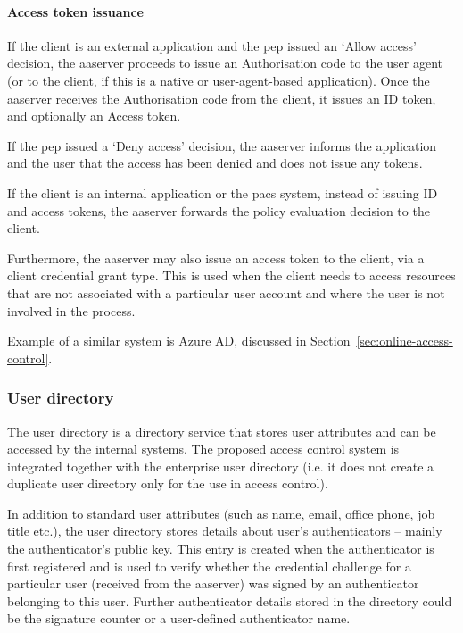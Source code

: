 \paragraph{Access token issuance}
If the client is an external application and the \acrshort{pep} issued an `Allow access' decision, the \acrshort{aaserver} proceeds to issue an Authorisation code to the user agent (or to the client, if this is a native or user-agent-based application). Once the \acrshort{aaserver} receives the Authorisation code from the client, it issues an ID token, and optionally an Access token.
    
If the \acrshort{pep} issued a `Deny access' decision, the \acrshort{aaserver} informs the application and the user that the access has been denied and does not issue any tokens. 
    
If the client is an internal application or the \acrshort{pacs} system, instead of issuing ID and access tokens, the \acrshort{aaserver} forwards the policy evaluation decision to the client.

Furthermore, the \acrshort{aaserver} may also issue an access token to the client, via a client credential grant type. This is used when the client needs to access resources that are not associated with a particular user account and where the user is not involved in the process.

Example of a similar system is Azure AD, discussed in Section~\ref{sec:online-access-control}.
    
\subsubsection{User directory}
The user directory is a directory service that stores user attributes and can be accessed by the internal systems. The proposed access control system is integrated together with the enterprise user directory (i.e. it does not create a duplicate user directory only for the use in access control).

In addition to standard user attributes (such as name, email, office phone, job title etc.), the user directory stores details about user's authenticators -- mainly the authenticator's public key. This entry is created when the authenticator is first registered and is used to verify whether the credential challenge for a particular user (received from the \acrshort{aaserver}) was signed by an authenticator belonging to this user. Further authenticator details stored in the directory could be the signature counter or a user-defined authenticator name.

